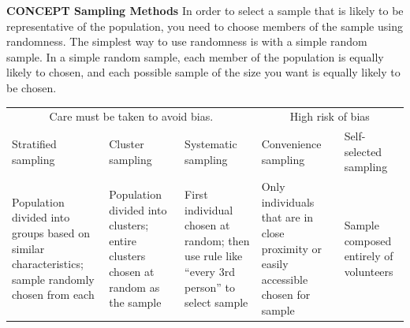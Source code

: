 \documentclass{article}
\newenvironment{concept-box}{}{}        %
\newcommand{\placeholder}[2]{}          %
\newcommand{\te}[1]{}                   %
\begin{document}
\begin{concept-box}
\textbf{CONCEPT Sampling Methods}
In order to select a sample that is likely to be representative of the population, you need to choose members of the sample using randomness. The simplest way to use randomness is with a simple random sample. In a simple random sample, each member of the population is equally likely to chosen, and each possible sample of the size you want is equally likely to be chosen.
\te{Printed equally likely to chosen; likely equally likely to be chosen.}
\te{Callout: Some sampling methods can involve randomness in other ways to select a sample. Some sampling methods do not use enough randomness to give reliable results.}
\begin{tabular}{lllll}
\multicolumn{3}{c}{Care must be taken to avoid bias.} & \multicolumn{2}{c}{High risk of bias} \\
Stratified sampling & Cluster sampling & Systematic sampling & Convenience sampling & Self-selected sampling \\
Population divided into groups based on similar characteristics; sample randomly chosen from each & Population divided into clusters; entire clusters chosen at random as the sample & First individual chosen at random; then use rule like ``every 3rd person'' to select sample & Only individuals that are in close proximity or easily accessible chosen for sample & Sample composed entirely of volunteers \\
\end{tabular}
\placeholder{diagram}{Five sampling diagrams with colored person icons. Stratified: three separate 2-by-3 groups, purple, blue, red; two outlined persons per group (purple middle column, blue top right and bottom middle, red top left and bottom middle). Cluster: same groups, whole six-person blue group outlined. Systematic: six rows of three mixed-color persons, right column outlined. Convenience: mixed persons in six rows of three, bottom two rows outlined nearest a black Researcher icon below. Self-selected: mixed colored persons, scattered raised-hand persons outlined.}
\end{concept-box}
\end{document}
